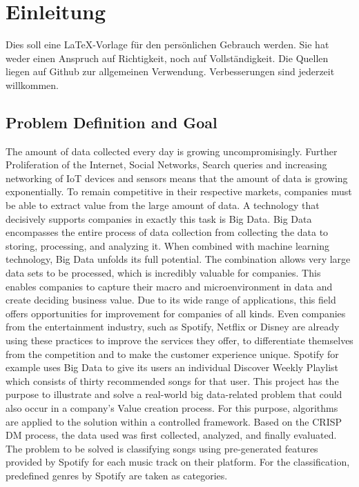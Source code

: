 \section{Einleitung}
Dies soll eine \LaTeX{}-Vorlage für den persönlichen Gebrauch werden. Sie hat weder einen Anspruch auf Richtigkeit, noch auf Vollständigkeit. Die Quellen liegen auf Github zur allgemeinen Verwendung. Verbesserungen sind jederzeit willkommen.

\subsection{Problem Definition and Goal}
The amount of data collected every day is growing uncompromisingly. Further Proliferation of the Internet, Social Networks, 
Search queries and increasing networking of IoT devices and sensors means that the amount of data is growing exponentially. 
To remain competitive in their respective markets, companies must be able to extract value from the large amount of data.
 A technology that decisively supports companies in exactly this task is Big Data. Big Data encompasses the entire process of data collection from collecting the data to storing, 
 processing, and analyzing it. When combined with machine learning technology, Big Data unfolds its full potential. The combination allows very large data sets to be processed, 
 which is incredibly valuable for companies. This enables companies to capture their macro and microenvironment in data and create deciding business value. 
 Due to its wide range of applications, this field offers opportunities for improvement for companies of all kinds. 
 Even companies from the entertainment industry, such as Spotify, Netflix or Disney are already using these practices to improve the services they offer, 
 to differentiate themselves from the competition and to make the customer experience unique. 
 Spotify for example uses Big Data to give its users an individual Discover Weekly Playlist which consists of thirty recommended songs for that user. 
 This project has the purpose to illustrate and solve a real-world big data-related problem that could also occur in a company's Value creation process. 
 For this purpose, algorithms are applied to the solution within a controlled framework. Based on the \ac{CRISP DM} process, the data used was first collected, analyzed, 
 and finally evaluated. The problem to be solved is classifying songs using pre-generated features provided by Spotify for each music track on their platform. 
 For the classification, predefined genres by Spotify are taken as categories.

